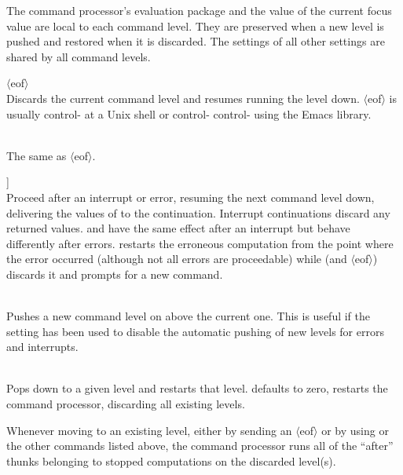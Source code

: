 The command processor's evaluation package and the value of the
current focus value are local to each command level.
They are preserved when a new level is pushed and restored when
 it is discarded.
The settings of all other settings are shared by all command levels.

\begin{description}
\item $\langle{}$eof$\rangle{}$\\
    Discards the current command level and resumes running the level down.
    $\langle{}$eof$\rangle{}$ is usually
    control- at a Unix shell or control- control- using
    the Emacs  library.

\item {}\\
 The same as $\langle{}$eof$\rangle{}$.

\item \code{,proceed [\cvar{exp} \ldots}]\\
 Proceed after an interrupt or error, resuming the next command
 level down, delivering the values of  to the continuation.
 Interrupt continuations discard any returned values.
  and  have the same effect after an interrupt
 but behave differently after errors.
  restarts the erroneous computation from the point where the
 error occurred (although not all errors are proceedable) while
  (and $\langle{}$eof$\rangle{}$) discards it and prompts for
 a new command.

\item {}\\
 Pushes a new command level on above the current one.
 This is useful if the  setting has been used
 to disable the automatic pushing of new levels for errors and interrupts.

\item {}\\
  Pops down to a given level and restarts that level.
   defaults to zero,  restarts the command
  processor, discarding all existing levels.

\end{description}

Whenever moving to an existing level, either by sending
 an $\langle{}$eof$\rangle{}$
 or by using  or the other commands listed above,
 the command processor runs all of the  ``after'' thunks
 belonging to stopped computations on the discarded level(s).

